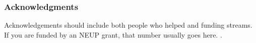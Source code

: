 \begin{frame}
  \frametitle{Acknowledgments}
        Acknowledgements should include both people who helped and funding 
        streams. If you are funded by an NEUP grant, that number usually goes 
        here. .
\end{frame}
